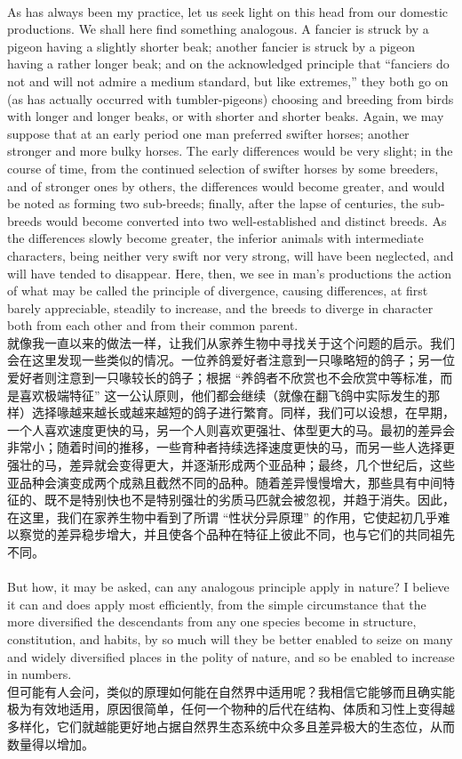 \documentclass{article}
\begin{document}
\\
As has always been my practice, let us seek light on this head from our domestic productions. We shall here find something analogous. A fancier is struck by a pigeon having a slightly shorter beak; another fancier is struck by a pigeon having a rather longer beak; and on the acknowledged principle that “fanciers do not and will not admire a medium standard, but like extremes,” they both go on (as has actually occurred with tumbler-pigeons) choosing and breeding from birds with longer and longer beaks, or with shorter and shorter beaks. Again, we may suppose that at an early period one man preferred swifter horses; another stronger and more bulky horses. The early differences would be very slight; in the course of time, from the continued selection of swifter horses by some breeders, and of stronger ones by others, the differences would become greater, and would be noted as forming two sub-breeds; finally, after the lapse of centuries, the sub-breeds would become converted into two well-established and distinct breeds. As the differences slowly become greater, the inferior animals with intermediate characters, being neither very swift nor very strong, will have been neglected, and will have tended to disappear. Here, then, we see in man’s productions the action of what may be called the principle of divergence, causing differences, at first barely appreciable, steadily to increase, and the breeds to diverge in character both from each other and from their common parent.\\
就像我一直以来的做法一样，让我们从家养生物中寻找关于这个问题的启示。我们会在这里发现一些类似的情况。一位养鸽爱好者注意到一只喙略短的鸽子；另一位爱好者则注意到一只喙较长的鸽子；根据 “养鸽者不欣赏也不会欣赏中等标准，而是喜欢极端特征” 这一公认原则，他们都会继续（就像在翻飞鸽中实际发生的那样）选择喙越来越长或越来越短的鸽子进行繁育。同样，我们可以设想，在早期，一个人喜欢速度更快的马，另一个人则喜欢更强壮、体型更大的马。最初的差异会非常小；随着时间的推移，一些育种者持续选择速度更快的马，而另一些人选择更强壮的马，差异就会变得更大，并逐渐形成两个亚品种；最终，几个世纪后，这些亚品种会演变成两个成熟且截然不同的品种。随着差异慢慢增大，那些具有中间特征的、既不是特别快也不是特别强壮的劣质马匹就会被忽视，并趋于消失。因此，在这里，我们在家养生物中看到了所谓 “性状分异原理” 的作用，它使起初几乎难以察觉的差异稳步增大，并且使各个品种在特征上彼此不同，也与它们的共同祖先不同。 \\

\\
But how, it may be asked, can any analogous principle apply in nature? I believe it can and does apply most efficiently, from the simple circumstance that the more diversified the descendants from any one species become in structure, constitution, and habits, by so much will they be better enabled to seize on many and widely diversified places in the polity of nature, and so be enabled to increase in numbers.\\
但可能有人会问，类似的原理如何能在自然界中适用呢？我相信它能够而且确实能极为有效地适用，原因很简单，任何一个物种的后代在结构、体质和习性上变得越多样化，它们就越能更好地占据自然界生态系统中众多且差异极大的生态位，从而数量得以增加。 \\
\end{document}
